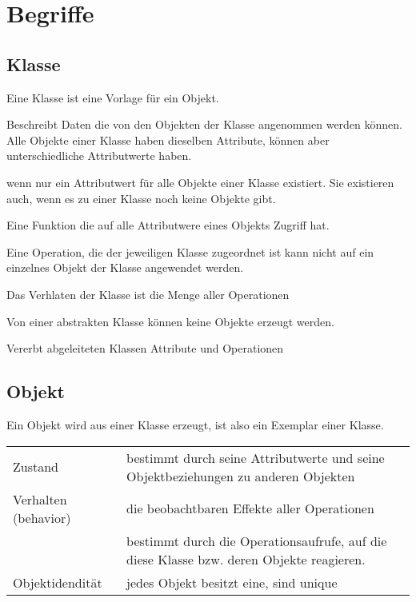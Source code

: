 \section{Begriffe}
\subsection{Klasse}
	Eine Klasse ist eine Vorlage für ein Objekt.\\
	\begin{description}[style=multiline,leftmargin=3.5cm,rightmargin=2cm, topsep=0pt]
	\item[Attribut] Beschreibt Daten die von den Objekten der Klasse angenommen
		werden können. Alle Objekte einer Klasse haben dieselben Attribute, können
		aber unterschiedliche Attributwerte haben.
	\item[Klassenattribut] wenn nur ein Attributwert für alle Objekte einer Klasse
		existiert. Sie existieren auch, wenn es zu einer Klasse noch keine Objekte
		gibt.
	\item[Operation] Eine Funktion die auf alle Attributwere eines Objekts Zugriff
		hat.
	\item[Klassenoperation] Eine Operation, die der jeweiligen Klasse zugeordnet
		ist kann nicht auf ein einzelnes Objekt der Klasse angewendet werden. 
	\item[Verhalten] Das Verhlaten der Klasse ist die Menge aller Operationen
	\item[Abstrakte] Von einer abstrakten Klasse können keine Objekte erzeugt
		werden.
	\item[Basisklasse] Vererbt abgeleiteten Klassen Attribute und Operationen
	\end{description}
	
\subsection{Objekt}
	Ein Objekt wird aus einer Klasse erzeugt, ist also ein Exemplar einer Klasse.\\
	\begin{tabular}{p{3.5cm}p{14.5cm}}
		Zustand & bestimmt durch seine Attributwerte und seine Objektbeziehungen zu
		anderen Objekten\\
		Verhalten (behavior) & die beobachtbaren Effekte aller Operationen\\
		& bestimmt durch die Operationsaufrufe, auf die diese Klasse bzw. deren Objekte
		reagieren.\\
		Objektidendität & jedes Objekt besitzt eine, sind unique\\
	\end{tabular}
